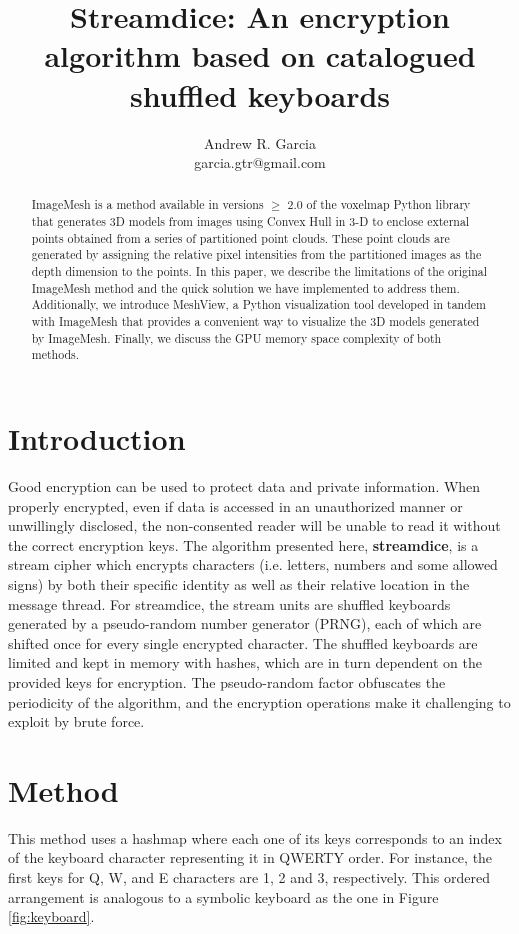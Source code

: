 \documentclass{article}
\title{Streamdice: An encryption algorithm based on catalogued shuffled keyboards}
\author{Andrew R. Garcia\\garcia.gtr@gmail.com}
\date{}
\begin{document}
\maketitle

\begin{abstract}
ImageMesh is a method available in versions $\geq$ 2.0 of the voxelmap Python library that generates 3D models from images using Convex Hull in 3-D to enclose external points obtained from a series of partitioned point clouds. These point clouds are generated by assigning the relative pixel intensities from the partitioned images as the depth dimension to the points. In this paper, we describe the limitations of the original ImageMesh method and the quick solution we have implemented to address them. Additionally, we introduce MeshView, a Python visualization tool developed in tandem with ImageMesh that provides a convenient way to visualize the 3D models generated by ImageMesh. Finally, we discuss the GPU memory space complexity of both methods.
\end{abstract}

\section{Introduction}
Good encryption can be used to protect data and private information. When properly encrypted, even if data is accessed in an unauthorized manner or unwillingly disclosed, the non-consented reader will be unable to read it without the correct encryption keys. The algorithm presented here, \textbf{streamdice}, is a stream cipher which encrypts characters (i.e. letters, numbers and some allowed signs) by both their specific identity as well as their relative location in the message thread. For streamdice, the stream units are shuffled keyboards generated by a pseudo-random number generator (PRNG), each of which are shifted once for every single encrypted character. The shuffled keyboards are limited and kept in memory with hashes, which are in turn dependent on the provided keys for encryption. The pseudo-random factor obfuscates the periodicity of the algorithm, and the encryption operations make it challenging to exploit by brute force.

\section{Method}
This method uses a hashmap where each one of its keys corresponds to an index of the keyboard character representing it in QWERTY order. 
For instance, the first keys for Q, W, and E characters are 1, 2 and 3, respectively. This ordered arrangement is analogous to a symbolic 
keyboard as the one in Figure \ref{fig:keyboard}.
\end{document}
